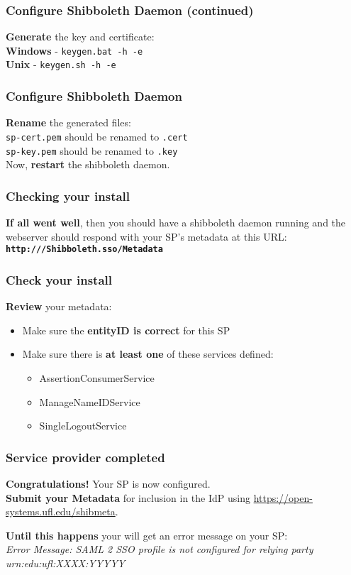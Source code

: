 \begin{frame}[fragile]
\frametitle{Configure Shibboleth Daemon (continued)}
\textbf{Generate} the key and certificate: \\ \bigskip
\textbf{Windows} - \texttt{keygen.bat -h  -e } \\
\bigskip
\textbf{Unix} - \texttt{keygen.sh -h  -e } \\
\end{frame}

\begin{frame}
\frametitle{Configure Shibboleth Daemon}
\textbf{Rename} the generated files: \\ \bigskip
\texttt{sp-cert.pem} should be renamed to \texttt{.cert} \\
\bigskip
\texttt{sp-key.pem} should be renamed to \texttt{.key} \\
\bigskip
Now, \textbf{restart} the shibboleth daemon.
\end{frame}

\begin{frame}
\frametitle{Checking your install}
\textbf{If all went well}, then you should have a shibboleth daemon running 
and the webserver should respond with your SP's metadata at this URL: \\ \bigskip
\textbf{\texttt{http:///Shibboleth.sso/Metadata}}
\end{frame}

\begin{frame}
\frametitle{Check your install}
\textbf{Review} your metadata:
\begin{itemize}
\item Make sure the \textbf{entityID is correct} for this SP
\item Make sure there is \textbf{at least one} of these services defined:
\begin{itemize}
\item AssertionConsumerService
\item ManageNameIDService
\item SingleLogoutService
\end{itemize}
\end{itemize}
\end{frame}

\begin{frame}
\frametitle{Service provider completed}
{\large \textbf{Congratulations!} Your SP is now configured.} \\
\bigskip
\textbf{Submit your Metadata} for inclusion in the IdP using \url{https://open-systems.ufl.edu/shibmeta}.

\bigskip \bigskip
\textbf{Until this happens} your will get an error message on your SP: \\ \bigskip
\textit{Error Message: SAML 2 SSO profile is not configured for relying party urn:edu:ufl:XXXX:YYYYY}
\end{frame}

